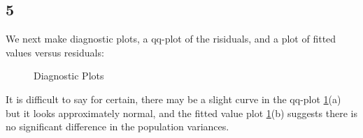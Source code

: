 \documentclass{article}
\begin{document}
    \subsection*{5}
    We next make diagnostic plots, a qq-plot of the risiduals, and a plot of fitted values versus residuals: 
    \begin{figure}[H]
    \centering
        \caption{Diagnostic Plots}
        \label{fig:diagnostic}
    \end{figure}
    It is difficult to say for certain, there may be a slight curve in the qq-plot \ref{fig:diagnostic}(a) but it looks approximately normal, and the fitted value plot \ref{fig:diagnostic}(b) suggests there is no significant difference in the population variances.
\end{document}

